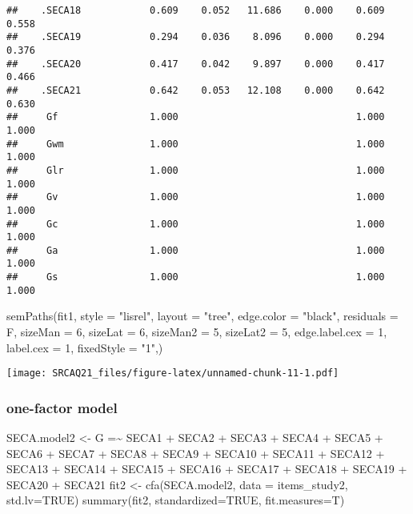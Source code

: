\documentclass[
]{article}
\newenvironment{Shaded}{\begin{snugshade}}{\end{snugshade}}
\newcommand{\AttributeTok}[1]{\textcolor[rgb]{0.77,0.63,0.00}{#1}}
\newcommand{\ConstantTok}[1]{\textcolor[rgb]{0.00,0.00,0.00}{#1}}
\newcommand{\DecValTok}[1]{\textcolor[rgb]{0.00,0.00,0.81}{#1}}
\newcommand{\FunctionTok}[1]{\textcolor[rgb]{0.00,0.00,0.00}{#1}}
\newcommand{\NormalTok}[1]{#1}
\newcommand{\OtherTok}[1]{\textcolor[rgb]{0.56,0.35,0.01}{#1}}
\newcommand{\StringTok}[1]{\textcolor[rgb]{0.31,0.60,0.02}{#1}}
\begin{document}
\begin{verbatim}
##    .SECA18            0.609    0.052   11.686    0.000    0.609    0.558
##    .SECA19            0.294    0.036    8.096    0.000    0.294    0.376
##    .SECA20            0.417    0.042    9.897    0.000    0.417    0.466
##    .SECA21            0.642    0.053   12.108    0.000    0.642    0.630
##     Gf                1.000                               1.000    1.000
##     Gwm               1.000                               1.000    1.000
##     Glr               1.000                               1.000    1.000
##     Gv                1.000                               1.000    1.000
##     Gc                1.000                               1.000    1.000
##     Ga                1.000                               1.000    1.000
##     Gs                1.000                               1.000    1.000
\end{verbatim}

\begin{Shaded}
\begin{Highlighting}[]
\FunctionTok{semPaths}\NormalTok{(fit1, }\AttributeTok{style =} \StringTok{"lisrel"}\NormalTok{, }\AttributeTok{layout =} \StringTok{"tree"}\NormalTok{, }\AttributeTok{edge.color =} \StringTok{"black"}\NormalTok{,}
         \AttributeTok{residuals =}\NormalTok{ F, }\AttributeTok{sizeMan =} \DecValTok{6}\NormalTok{, }\AttributeTok{sizeLat =} \DecValTok{6}\NormalTok{, }\AttributeTok{sizeMan2 =} \DecValTok{5}\NormalTok{, }\AttributeTok{sizeLat2 =} \DecValTok{5}\NormalTok{, }
         \AttributeTok{edge.label.cex =} \DecValTok{1}\NormalTok{, }\AttributeTok{label.cex =} \DecValTok{1}\NormalTok{, }\AttributeTok{fixedStyle =} \StringTok{"1"}\NormalTok{,)}
\end{Highlighting}
\end{Shaded}

\texttt{[image: SRCAQ21\_files/figure-latex/unnamed-chunk-11-1.pdf]}

\hypertarget{one-factor-model}{%
\subsubsection{one-factor model}\label{one-factor-model}}

\begin{Shaded}
\begin{Highlighting}[]
\NormalTok{SECA.model2 }\OtherTok{\textless{}{-}} \StringTok{\textquotesingle{} }
\StringTok{G =\textasciitilde{} SECA1 + SECA2 + SECA3 + SECA4 + SECA5 + SECA6 + SECA7 + SECA8 + SECA9 + SECA10 + }
\StringTok{SECA11 + SECA12 + SECA13 + SECA14 + SECA15 + SECA16 + SECA17 + SECA18 + SECA19 + SECA20 + SECA21}
\StringTok{\textquotesingle{}}
\NormalTok{fit2 }\OtherTok{\textless{}{-}} \FunctionTok{cfa}\NormalTok{(SECA.model2, }\AttributeTok{data =}\NormalTok{ items\_study2, }\AttributeTok{std.lv=}\ConstantTok{TRUE}\NormalTok{)}
\FunctionTok{summary}\NormalTok{(fit2, }\AttributeTok{standardized=}\ConstantTok{TRUE}\NormalTok{, }\AttributeTok{fit.measures=}\NormalTok{T)}
\end{Highlighting}
\end{Shaded}
\end{document}
